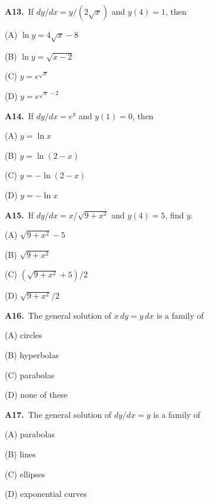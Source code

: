 \documentclass[11pt]{article}
\begin{document}
\bigskip\noindent\textbf{A13.}\ If $dy/dx=y/(2\sqrt x)$ and $y(4)=1$, then
\begin{list}{}{\setlength{\leftmargin}{3em}\setlength{\labelwidth}{2.5em}\setlength{\itemsep}{0pt}\setlength{\topsep}{2pt}}
\item[(A)] $\ln y=4\sqrt x-8$
\item[(B)] $\ln y=\sqrt{x-2}$
\item[(C)] $y=e^{\sqrt x}$
\item[(D)] $y=e^{\sqrt x-2}$
\end{list}

\bigskip\noindent\textbf{A14.}\ If $dy/dx=e^y$ and $y(1)=0$, then
\begin{list}{}{\setlength{\leftmargin}{3em}\setlength{\labelwidth}{2.5em}\setlength{\itemsep}{0pt}\setlength{\topsep}{2pt}}
\item[(A)] $y=\ln x$
\item[(B)] $y=\ln(2-x)$
\item[(C)] $y=-\ln(2-x)$
\item[(D)] $y=-\ln x$
\end{list}

\bigskip\noindent\textbf{A15.}\ If $dy/dx=x/\sqrt{9+x^2}$ and $y(4)=5$, find $y$.
\begin{list}{}{\setlength{\leftmargin}{3em}\setlength{\labelwidth}{2.5em}\setlength{\itemsep}{0pt}\setlength{\topsep}{2pt}}
\item[(A)] $\sqrt{9+x^2}-5$
\item[(B)] $\sqrt{9+x^2}$
\item[(C)] $(\sqrt{9+x^2}+5)/2$
\item[(D)] $\sqrt{9+x^2}/2$
\end{list}

\bigskip\noindent\textbf{A16.}\ The general solution of $x\,dy=y\,dx$ is a family of
\begin{list}{}{\setlength{\leftmargin}{3em}\setlength{\labelwidth}{2.5em}\setlength{\itemsep}{0pt}\setlength{\topsep}{2pt}}
\item[(A)] circles
\item[(B)] hyperbolas
\item[(C)] parabolas
\item[(D)] none of these
\end{list}

\bigskip\noindent\textbf{A17.}\ The general solution of $dy/dx=y$ is a family of
\begin{list}{}{\setlength{\leftmargin}{3em}\setlength{\labelwidth}{2.5em}\setlength{\itemsep}{0pt}\setlength{\topsep}{2pt}}
\item[(A)] parabolas
\item[(B)] lines
\item[(C)] ellipses
\item[(D)] exponential curves
\end{list}
\end{document}
